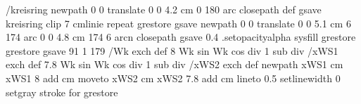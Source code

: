 {{%
/kreisring { newpath
                      0 0 translate
                      0 0 4.2 cm 0 180 arc
                     closepath
                    } def
               gsave
                        kreisring clip
                        7 {cmlinie} repeat
              grestore
   gsave
                 newpath
                      0 0 translate
                      0 0 5.1 cm 6 174 arc
                      0 0 4.8 cm 174 6 arcn
                 closepath
                   gsave
                    \pst@usecolor\ProLineCol
                       0.4 .setopacityalpha
                       sysfill
                 grestore
   grestore
 gsave
   91 1 179 { /Wk exch def %
                       {8 Wk sin Wk cos div 1 sub div} /xWS1 exch def %
                       {7.8 Wk sin Wk cos div 1 sub div} /xWS2 exch def %
                        newpath
                        xWS1 cm xWS1 8 add cm moveto %
                        xWS2 cm xWS2 7.8 add cm %
                       lineto
                       0.5 setlinewidth
                       0 setgray
                       stroke
                   } for
  grestore
}}
